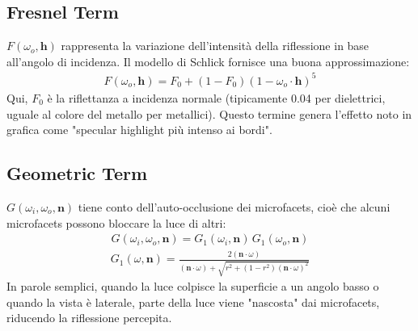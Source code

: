 \documentclass[12pt,a4paper,openright,twoside]{book}
\begin{document}
\subsection*{Fresnel Term}
$F(\omega_o,\mathbf{h})$ rappresenta la variazione dell'intensità della riflessione in base all'angolo di incidenza.
Il modello di Schlick fornisce una buona approssimazione:
\begin{align*}
F(\omega_o,\mathbf{h}) = F_0 + (1 - F_0)(1 - \omega_o\cdot\mathbf{h})^5
\end{align*}
\noindent
Qui, $F_0$ è la riflettanza a incidenza normale (tipicamente 0.04 per dielettrici, uguale al colore del
metallo per metallici).
Questo termine genera l'effetto noto in grafica come "specular highlight più intenso ai bordi".

\subsection*{Geometric Term}
$G(\omega_i,\omega_o,\mathbf{n})$ tiene conto dell'auto-occlusione dei microfacets, cioè che alcuni microfacets
possono bloccare la luce di altri:
\begin{align*}
G(\omega_i,\omega_o,\mathbf{n}) = G_1(\omega_i,\mathbf{n}) \, G_1(\omega_o,\mathbf{n})
\end{align*}
\begin{align*}
G_1(\omega,\mathbf{n}) =
\frac{2(\mathbf{n}\cdot\omega)}
{(\mathbf{n}\cdot\omega) + \sqrt{r^2 + (1-r^2)(\mathbf{n}\cdot\omega)^2}}
\end{align*}
In parole semplici, quando la luce colpisce la superficie a un angolo basso o quando la vista è laterale, parte
della luce viene "nascosta" dai microfacets, riducendo la riflessione percepita.
\end{document}
